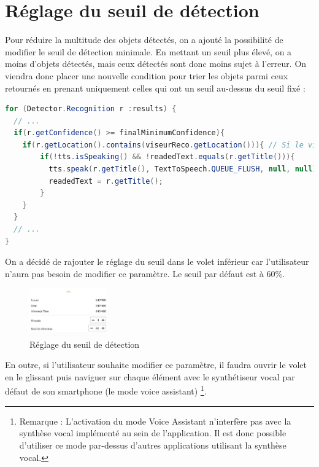 \documentclass[UTF8]{EPURapport}
\begin{document}

\section{Réglage du seuil de détection}

Pour réduire la multitude des objets détectés, on a ajouté la possibilité de modifier le seuil de détection minimale. En mettant un seuil plus élevé, on a moins d'objets détectés, mais ceux détectés sont donc moins sujet à l'erreur. On viendra donc placer une nouvelle condition pour trier les objets parmi ceux retournés en prenant uniquement celles qui ont un seuil au-dessus du seuil fixé :\\

\begin{lstlisting}[language=Java]
for (Detector.Recognition r :results) {
  // ...
  if(r.getConfidence() >= finalMinimumConfidence){
  	if(r.getLocation().contains(viseurReco.getLocation())){ // Si le viseur est dans l'objet detecte
	    if(!tts.isSpeaking() && !readedText.equals(r.getTitle())){
	      tts.speak(r.getTitle(), TextToSpeech.QUEUE_FLUSH, null, null);
	      readedText = r.getTitle();
	    }
    }
  }
  // ...
}
\end{lstlisting}

On a décidé de rajouter le réglage du seuil dans le volet inférieur car l'utilisateur n'aura pas besoin de modifier ce paramètre. Le seuil par défaut est à 60\%.\\

\begin{figure}[h!]
\centering
  \includegraphics[width=0.3\textwidth]{images/seuil.JPG}
  \caption{Réglage du seuil de détection}
  \label{fig:seuil}
\end{figure}

En outre, si l'utilisateur souhaite modifier ce paramètre, il faudra ouvrir le volet en le glissant puis naviguer sur chaque élément avec le synthétiseur vocal par défaut de son smartphone (le mode voice assistant) \footnote{Remarque : L'activation du mode Voice Assistant n'interfère pas avec la synthèse vocal implémenté au sein de l'application. Il est donc possible d'utiliser ce mode par-dessus d'autres applications utilisant la synthèse vocal.}.
\end{document}
